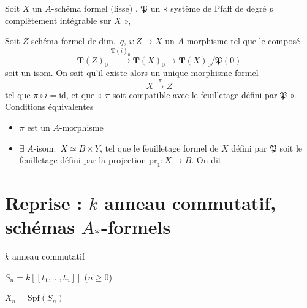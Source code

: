 \documentclass[11pt,a4paper]{article}
\begin{document}
  Soit $X$ un $A$-schéma formel (lisse)
, $\mathfrak{P}$ un « système de Pfaff de degré $p$
complètement intégrable sur $X$ », 

Soit $Z$ schéma formel  de dim.\ $q$,
$i : Z \to X$ un $A$-morphisme tel que le composé
\[
  \mathbf{T}(Z)_0 \xrightarrow{\mathbf{T}(i)_0} \mathbf{T}(X)_0 \to
  \mathbf{T}(X)_0 / \mathfrak{P}(0)
\]
soit un isom. On sait qu'il existe alors un unique morphisme formel
\[
  X \xrightarrow{\pi} Z
\]
tel que $\pi \circ i = \mathrm{id}$, et que « $\pi$ soit 
compatible avec le feuilletage défini par $\mathfrak{P}$ ». Conditions
équivalentes

\begin{itemize}
  \item[(i)] $\pi$ est un $A$-morphisme
  \item[(ii)] $\exists$ $A$-isom.\ $X \simeq B \times Y$, tel que le feuilletage
    formel de $X$ défini par $\mathfrak{P}$ soit le feuilletage défini par la
    projection $\mathrm{pr}_1 : X \to B$. On dit
\end{itemize}


\section{Reprise : $k$ anneau commutatif, schémas $A_*$-formels}




$k$ anneau commutatif

$S_n = k[[t_1, \ldots, t_n]]$ \quad ($n \geq 0$)

$X_n = \mathrm{Spf}(S_n)$
\end{document}
